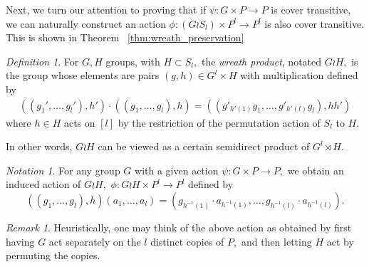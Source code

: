 \documentclass{amsart}
\theoremstyle{remark}
\newtheorem{rem}[thm]{Remark}
\newtheorem{defn}[thm]{Definition}
\newtheorem{note}[thm]{Notation}
\begin{document}
Next, we turn our attention to proving that if $\psi:G \times P \rightarrow P$ is cover transitive, we can naturally construct an action $\phi:(G\wr S_l)\times P^l \rightarrow P^l$ is also cover transitive. This is shown in Theorem ~\ref{thm:wreath_preservation}

\begin{defn}
For $G, H$ groups, with $H \subset S_l,$ the {\it wreath product}, notated $G \wr H,$ is the group whose elements are pairs $(g,h) \in G^l\times H$ with multiplication defined by
\begin{align*}
((g_1',\ldots, g_l'),h') \cdot ((g_1,\ldots, g_l) ,h) =((g'_{h'(1)}g_1,\ldots, g'_{h'(l)}g_l),hh')
\end{align*}
where $h \in H$ acts on $[l]$ by the restriction of the permutation action of $S_l$ to $H.$
\end{defn}

In other words, $G\wr H$ can be viewed as a certain semidirect product of $G^l \rtimes H.$

\begin{note}
\label{note:wreath_action}
For any group $G$ with a given action $\psi:G\times P \rightarrow P,$ we obtain an induced action of $G \wr H,$ $\phi:G \wr H \times P^l \rightarrow P^l$ defined by 
$$((g_1,\ldots, g_l),h)(a_1,\ldots, a_l) = (g_{h^{-1}(1)}\cdot a_{h^{-1}(1)},\ldots,g_{h^{-1}(l)} \cdot a_{h^{-1}(l)}).$$
\end{note}

\begin{rem}
Heuristically, one may think of the above action as obtained by first having $G$ act separately on the $l$ distinct copies of $P,$ and then letting $H$ act by permuting the copies.
\end{rem}
\end{document}

